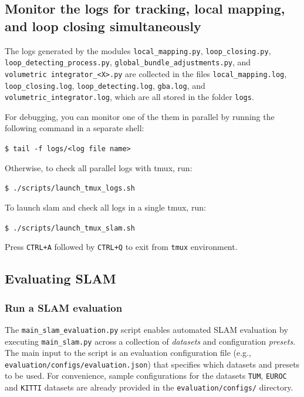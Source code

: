 \documentclass{article}
\newenvironment{Shaded}{\begin{snugshade}}{\end{snugshade}}
\newcommand{\BuiltInTok}[1]{\textcolor[rgb]{0.74,0.68,0.62}{#1}}
\newcommand{\ExtensionTok}[1]{\textcolor[rgb]{0.74,0.68,0.62}{#1}}
\newcommand{\NormalTok}[1]{\textcolor[rgb]{0.74,0.68,0.62}{#1}}
\newcommand{\codeline}[1]{\texttt{\NormalTok{\$ }\BuiltInTok{\ExtensionTok{#1}}}}
\newenvironment{codeblock}
{
\begin{scriptsize}
\begin{Shaded}
}
{
\end{Shaded}
\end{scriptsize}
}
\begin{document}
\hypertarget{monitor-the-logs-for-tracking-local-mapping-and-loop-closing-simultaneously}{%
\subsection{Monitor the logs for tracking, local mapping, and loop
closing
simultaneously}\label{monitor-the-logs-for-tracking-local-mapping-and-loop-closing-simultaneously}}

The logs generated by the modules \texttt{local\_mapping.py},
\texttt{loop\_closing.py}, \texttt{loop\_detecting\_process.py},
\texttt{global\_bundle\_adjustments.py}, and
\texttt{volumetric\ integrator\_\textless{}X\textgreater{}.py} are
collected in the files \texttt{local\_mapping.log},
\texttt{loop\_closing.log}, \texttt{loop\_detecting.log},
\texttt{gba.log}, and \texttt{volumetric\_integrator.log}, which are all
stored in the folder \texttt{logs}. 

For debugging, you can monitor one
of the them in parallel by running the following command in a separate
shell:\\
\begin{codeblock}
\codeline{tail\ -f\ logs/\textless{}log\ file\ name\textgreater{}}
\end{codeblock}
Otherwise, to check all parallel logs with tmux, run:\\
\begin{codeblock}
\codeline{./scripts/launch\_tmux\_logs.sh}
\end{codeblock}
To launch slam and check all logs in a single tmux, run:\\
\begin{codeblock}
\codeline{./scripts/launch\_tmux\_slam.sh}
\end{codeblock}
Press \texttt{CTRL+A} followed by \texttt{CTRL+Q} to exit from
\texttt{tmux} environment.

\hypertarget{evaluating-slam}{%
\subsection{Evaluating SLAM}\label{evaluating-slam}}

\hypertarget{run-a-slam-evaluation}{%
\subsubsection{Run a SLAM evaluation}\label{run-a-slam-evaluation}}

The \texttt{main\_slam\_evaluation.py} script enables automated SLAM
evaluation by executing \texttt{main\_slam.py} across a collection of
\textit{datasets} and configuration \textit{presets}. The main input to the script is an evaluation configuration file (e.g., \texttt{evaluation/configs/evaluation.json}) that specifies which datasets and presets to be used. For convenience, sample configurations for the datasets \texttt{TUM}, \texttt{EUROC} and \texttt{KITTI} datasets are already provided in the \texttt{evaluation/configs/} directory.
\end{document}
